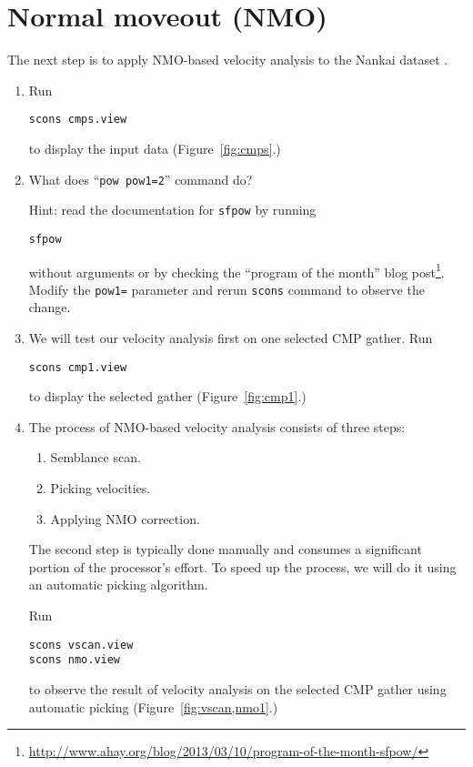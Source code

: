 \section{Normal moveout (NMO)}

The next step is to apply NMO-based velocity
analysis to the Nankai dataset \cite[]{CSI00-00-00010213}.

\begin{enumerate}          
\item Run
\begin{verbatim}
scons cmps.view 
\end{verbatim}
to display the input data (Figure~\ref{fig:cmps}.)

\item What does ``\texttt{pow pow1=2}'' command do? 

Hint: read the documentation for \texttt{sfpow} by running
\begin{verbatim}
sfpow
\end{verbatim}
without arguments or by checking the ``program of the month'' blog
post\footnote{\url{http://www.ahay.org/blog/2013/03/10/program-of-the-month-sfpow/}}. Modify
the \texttt{pow1=} parameter and rerun \texttt{scons} command to
observe the change.


\item We will test our velocity analysis first on one selected CMP gather. Run
\begin{verbatim}
scons cmp1.view
\end{verbatim}
to display the selected gather (Figure~\ref{fig:cmp1}.)


\item The process of NMO-based velocity analysis consists of three steps:
\begin{enumerate}
\item Semblance scan.
\item Picking velocities.
\item Applying NMO correction.
\end{enumerate}
The second step is typically done manually and consumes a significant
portion of the processor's effort. To speed up the process, we will do
it using an automatic picking algorithm.

Run
\begin{verbatim}
scons vscan.view
scons nmo.view
\end{verbatim}
to observe the result of velocity analysis on the selected CMP gather
using automatic picking (Figure~\ref{fig:vscan,nmo1}.)


\end{enumerate}
